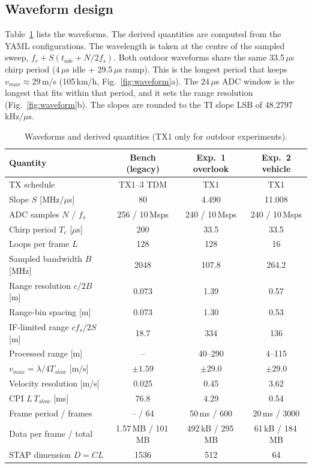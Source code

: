 \documentclass[conference]{IEEEtran}
\begin{document}
\subsection{Waveform design}
Table~\ref{tab:waveform} lists the waveforms. The derived quantities are computed from the YAML
configurations. The wavelength is taken at the centre of the sampled sweep,
$f_c+S(t_{adc}+N/2f_s)$. Both outdoor waveforms share the same 33.5\,$\mu$s chirp period (4\,$\mu$s
idle + 29.5\,$\mu$s ramp). This is the longest period that keeps $v_{max}\approx29$\,m/s
(105\,km/h, Fig.~\ref{fig:waveform}a). The 24\,$\mu$s ADC window is the longest that fits within
that period, and it sets the range resolution (Fig.~\ref{fig:waveform}b). The slopes are rounded
to the TI slope LSB of 48.2797\,kHz/$\mu$s.

\begin{table}[t]
\centering
\caption{Waveforms and derived quantities (TX1 only for outdoor experiments).}
\label{tab:waveform}
\setlength{\tabcolsep}{3pt}
\begin{tabular}{lccc}
\toprule
Quantity & Bench (legacy) & Exp.~1 overlook & Exp.~2 vehicle \\
\midrule
TX schedule & TX1--3 TDM & TX1 & TX1 \\
Slope $S$ [MHz/$\mu$s] & 80 & 4.490 & 11.008 \\
ADC samples $N$ / $f_s$ & 256 / 10\,Msps & 240 / 10\,Msps & 240 / 10\,Msps \\
Chirp period $T_c$ [$\mu$s] & 200 & 33.5 & 33.5 \\
Loops per frame $L$ & 128 & 128 & 16 \\
Sampled bandwidth $B$ [MHz] & 2048 & 107.8 & 264.2 \\
Range resolution $c/2B$ [m] & 0.073 & 1.39 & 0.57 \\
Range-bin spacing [m] & 0.073 & 1.30 & 0.53 \\
IF-limited range $cf_s/2S$ [m] & 18.7 & 334 & 136 \\
Processed range [m] & -- & 40--290 & 4--115 \\
$v_{max}=\lambda/4T_{slow}$ [m/s] & $\pm1.59$ & $\pm29.0$ & $\pm29.0$ \\
Velocity resolution [m/s] & 0.025 & 0.45 & 3.62 \\
CPI $L\,T_{slow}$ [ms] & 76.8 & 4.29 & 0.54 \\
Frame period / frames & -- / 64 & 50\,ms / 600 & 20\,ms / 3000 \\
Data per frame / total & 1.57\,MB / 101\,MB & 492\,kB / 295\,MB & 61\,kB / 184\,MB \\
STAP dimension $D=CL$ & 1536 & 512 & 64 \\
\bottomrule
\end{tabular}
\end{table}
\end{document}
